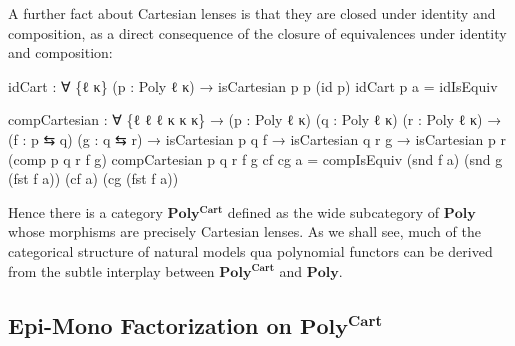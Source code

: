 \documentclass[
  11pt,
  oneside,
  article]{memoir}
\newenvironment{Shaded}{}{}
\newcommand{\NormalTok}[1]{#1}
\newcommand{\OtherTok}[1]{\textcolor[rgb]{0.00,0.44,0.13}{#1}}
\theoremstyle{definition}
\theoremstyle{plain}
\newcommand{\0}{\textsf{0}}
\newcommand{\1}{\tn{\textsf{1}}}
\begin{document}
A further fact about Cartesian lenses is that they are closed under
identity and composition, as a direct consequence of the closure of
equivalences under identity and composition:

\begin{Shaded}
\begin{Highlighting}[]
\NormalTok{idCart }\OtherTok{:} \OtherTok{∀} \OtherTok{\{}\NormalTok{ℓ κ}\OtherTok{\}} \OtherTok{(}\NormalTok{p }\OtherTok{:}\NormalTok{ Poly ℓ κ}\OtherTok{)}
         \OtherTok{→}\NormalTok{ isCartesian p p }\OtherTok{(}\NormalTok{id p}\OtherTok{)}
\NormalTok{idCart p a }\OtherTok{=}\NormalTok{ idIsEquiv}

\NormalTok{compCartesian }\OtherTok{:} \OtherTok{∀} \OtherTok{\{}\NormalTok{ℓ ℓ\textquotesingle{} ℓ\textquotesingle{}\textquotesingle{} κ κ\textquotesingle{} κ\textquotesingle{}\textquotesingle{}}\OtherTok{\}}
                \OtherTok{→} \OtherTok{(}\NormalTok{p }\OtherTok{:}\NormalTok{ Poly ℓ κ}\OtherTok{)} \OtherTok{(}\NormalTok{q }\OtherTok{:}\NormalTok{ Poly ℓ\textquotesingle{} κ\textquotesingle{}}\OtherTok{)} \OtherTok{(}\NormalTok{r }\OtherTok{:}\NormalTok{ Poly ℓ\textquotesingle{}\textquotesingle{} κ\textquotesingle{}\textquotesingle{}}\OtherTok{)}
                \OtherTok{→} \OtherTok{(}\NormalTok{f }\OtherTok{:}\NormalTok{ p ⇆ q}\OtherTok{)} \OtherTok{(}\NormalTok{g }\OtherTok{:}\NormalTok{ q ⇆ r}\OtherTok{)}
                \OtherTok{→}\NormalTok{ isCartesian p q f }\OtherTok{→}\NormalTok{ isCartesian q r g }
                \OtherTok{→}\NormalTok{ isCartesian p r }\OtherTok{(}\NormalTok{comp p q r f g}\OtherTok{)}
\NormalTok{compCartesian p q r f g cf cg a }\OtherTok{=} 
\NormalTok{    compIsEquiv }\OtherTok{(}\NormalTok{snd f a}\OtherTok{)} \OtherTok{(}\NormalTok{snd g }\OtherTok{(}\NormalTok{fst f a}\OtherTok{))} \OtherTok{(}\NormalTok{cf a}\OtherTok{)} \OtherTok{(}\NormalTok{cg }\OtherTok{(}\NormalTok{fst f a}\OtherTok{))}
\end{Highlighting}
\end{Shaded}

Hence there is a category \(\mathbf{Poly^{Cart}}\) defined as the wide
subcategory of \(\mathbf{Poly}\) whose morphisms are precisely Cartesian
lenses. As we shall see, much of the categorical structure of natural
models qua polynomial functors can be derived from the subtle interplay
between \(\mathbf{Poly^{Cart}}\) and \(\mathbf{Poly}\).

\subsection{\texorpdfstring{Epi-Mono Factorization on
\(\mathbf{Poly^{Cart}}\)}{Epi-Mono Factorization on \textbackslash mathbf\{Poly\^{}\{Cart\}\}}}\label{epi-mono-factorization-on-mathbfpolycart}
\end{document}
